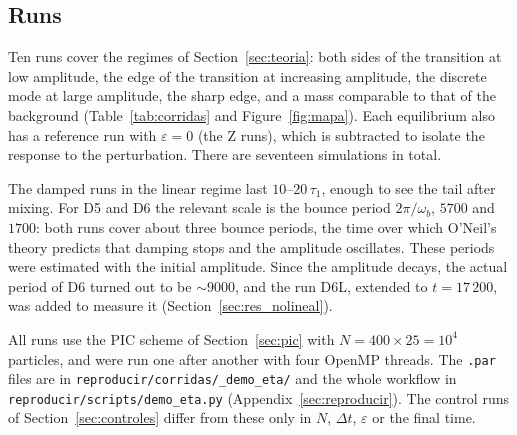 \documentclass[11pt,a4paper]{article}
\begin{document}
\subsection{Runs}
\label{sec:corridas}

Ten runs cover the regimes of Section~\ref{sec:teoria}: both sides of the transition
at low amplitude, the edge of the transition at increasing amplitude, the discrete mode
at large amplitude, the sharp edge, and a mass comparable to that of the background
(Table~\ref{tab:corridas} and Figure~\ref{fig:mapa}). Each equilibrium also has a
reference run with $\varepsilon=0$ (the Z runs), which is subtracted to isolate the
response to the perturbation. There are seventeen simulations in total.

The damped runs in the linear regime last $10$--$20\,\tau_1$, enough to see the tail after
mixing. For D5 and D6 the relevant scale is the bounce period $2\pi/\omega_b$, $5700$ and
$1700$: both runs cover about three bounce periods, the time over which O'Neil's theory
predicts that damping stops and the amplitude oscillates. These periods were estimated
with the initial amplitude. Since the amplitude decays, the actual period of D6 turned
out to be $\sim9000$, and the run D6L, extended to $t=17\,200$, was added to measure it
(Section~\ref{sec:res_nolineal}).

All runs use the PIC scheme of Section~\ref{sec:pic} with $N=400\times25=10^4$ particles,
and were run one after another with four OpenMP threads. The \texttt{.par} files are in
\texttt{reproducir/\allowbreak corridas/\_demo\_eta/} and the whole workflow in
\texttt{reproducir/\allowbreak scripts/\allowbreak demo\_eta.py} (Appendix~\ref{sec:reproducir}). The control runs
of Section~\ref{sec:controles} differ from these only in $N$, $\Delta t$, $\varepsilon$ or
the final time.
\end{document}
